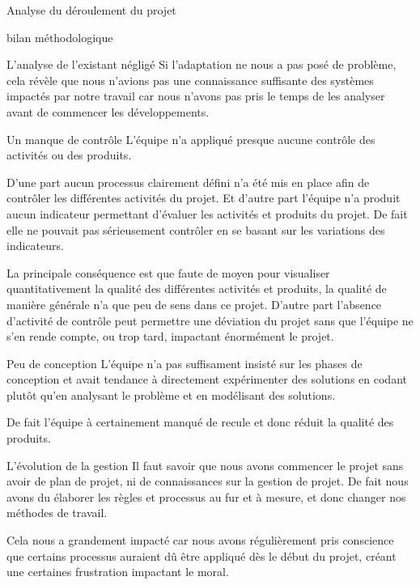 \documentclass[]{article}
\begin{document}
{\begin{section}{Analyse du déroulement du projet}
\begin{subsection}{bilan méthodologique}
\begin{subsubsection}{L'analyse de l'existant négligé}
         Si l'adaptation ne nous a pas posé de problème, cela révèle que nous n'avions pas une connaissance suffisante des systèmes impactés par notre travail car nous n'avons pas pris le temps de les analyser avant de commencer les développements.
     \end{subsubsection}

     \begin{subsubsection}{Un manque de contrôle}
         L'équipe n'a appliqué presque aucune contrôle des activités ou des produits.

         D'une part aucun processus clairement défini n'a été mis en place afin de contrôler les différentes activités du projet. Et d'autre part l'équipe n'a produit aucun indicateur permettant d'évaluer les activités et produits du projet. De fait elle ne pouvait pas sérieusement contrôler en se basant sur les variations des indicateurs.

         La principale conséquence est que faute de moyen pour visualiser quantitativement la qualité des différentes activités et produits, la qualité de manière générale n'a que peu de sens dans ce projet. D'autre part l'absence d'activité de contrôle peut permettre une déviation du projet sans que l'équipe ne s'en rende compte, ou trop tard, impactant énormément le projet.
     \end{subsubsection}

     \begin{subsubsection}{Peu de conception}
         L'équipe n'a pas suffisament insisté sur les phases de conception et avait tendance à directement expérimenter des solutions en codant plutôt qu'en analysant le problème et en modélisant des solutions.

         De fait l'équipe à certainement manqué de recule et donc réduit la qualité des produits.
     \end{subsubsection}

     \begin{subsubsection}{L'évolution de la gestion}
         Il faut savoir que nous avons commencer le projet sans avoir de plan de projet, ni de connaissances sur la gestion de projet. De fait nous avons du élaborer les règles et processus au fur et à mesure, et donc changer nos méthodes de travail.

         Cela nous a grandement impacté car nous avons régulièrement pris conscience que certains processus auraient dû être appliqué dès le début du projet, créant une certaines frustration impactant le moral.
     \end{subsubsection}


\end{subsection}
\end{section}}
\end{document}
